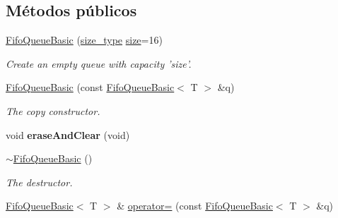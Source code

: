 \subsection*{\-Métodos públicos}
\begin{DoxyCompactItemize}
\item 
\hypertarget{classxsens_1_1FifoQueueBasic_a4943e456da5439290e6e2e705dc350db}{\hyperlink{classxsens_1_1FifoQueueBasic_a4943e456da5439290e6e2e705dc350db}{\-Fifo\-Queue\-Basic} (\hyperlink{classxsens_1_1FifoQueueBasic_abef5a7d633ee8b57a33360bf3b3efdef}{size\-\_\-type} \hyperlink{classxsens_1_1FifoQueueBasic_a918b730b9085edd926404337d588d002}{size}=16)}\label{classxsens_1_1FifoQueueBasic_a4943e456da5439290e6e2e705dc350db}

\begin{DoxyCompactList}\small\item\em \-Create an empty queue with capacity 'size'. \end{DoxyCompactList}\item 
\hypertarget{classxsens_1_1FifoQueueBasic_a9f922ea1e1773b296304deabf6e2bde3}{\hyperlink{classxsens_1_1FifoQueueBasic_a9f922ea1e1773b296304deabf6e2bde3}{\-Fifo\-Queue\-Basic} (const \hyperlink{classxsens_1_1FifoQueueBasic}{\-Fifo\-Queue\-Basic}$<$ \-T $>$ \&q)}\label{classxsens_1_1FifoQueueBasic_a9f922ea1e1773b296304deabf6e2bde3}

\begin{DoxyCompactList}\small\item\em \-The copy constructor. \end{DoxyCompactList}\item 
\hypertarget{classxsens_1_1FifoQueueBasic_a26b594e18f5b4f0a3a21eb0c82928590}{void {\bfseries erase\-And\-Clear} (void)}\label{classxsens_1_1FifoQueueBasic_a26b594e18f5b4f0a3a21eb0c82928590}

\item 
\hypertarget{classxsens_1_1FifoQueueBasic_a0e9808c170b05a5616c193525d1b324c}{\hyperlink{classxsens_1_1FifoQueueBasic_a0e9808c170b05a5616c193525d1b324c}{$\sim$\-Fifo\-Queue\-Basic} ()}\label{classxsens_1_1FifoQueueBasic_a0e9808c170b05a5616c193525d1b324c}

\begin{DoxyCompactList}\small\item\em \-The destructor. \end{DoxyCompactList}\item 
\hypertarget{classxsens_1_1FifoQueueBasic_aa53f27abd204394954d2a15b03eeb025}{\hyperlink{classxsens_1_1FifoQueueBasic}{\-Fifo\-Queue\-Basic}$<$ \-T $>$ \& \hyperlink{classxsens_1_1FifoQueueBasic_aa53f27abd204394954d2a15b03eeb025}{operator=} (const \hyperlink{classxsens_1_1FifoQueueBasic}{\-Fifo\-Queue\-Basic}$<$ \-T $>$ \&q)}\label{classxsens_1_1FifoQueueBasic_aa53f27abd204394954d2a15b03eeb025}


\end{DoxyCompactItemize}
